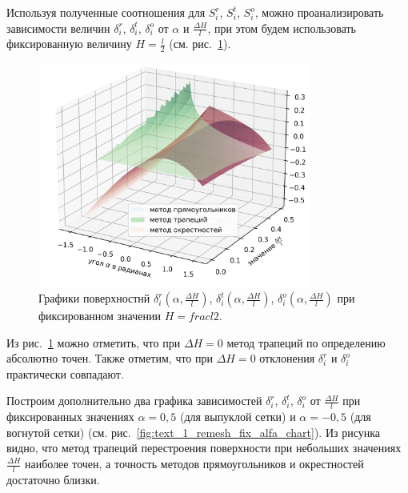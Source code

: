 Используя полученные соотношения для $S_i^r$, $S_i^t$, $S_i^o$, можно проанализировать зависимости величин $\delta_i^r$, $\delta_i^t$, $\delta_i^o$ от $\alpha$ и $\frac{\Delta H}{l}$, при этом будем использовать фиксированную величину $H = \frac{l}{2}$ (см. рис.~\ref{fig:text_1_remesh_3d_main_chart}).

\begin{figure}[ht]
\centering
\includegraphics[width=0.8\textwidth]{pics/text_1_remesh_2d/remesh_3d_chart.png}
\singlespacing
{}\caption{Графики поверхностнй $\delta_i^r(\alpha, \frac{\Delta H}{l})$, $\delta_i^t(\alpha, \frac{\Delta H}{l})$, $\delta_i^o(\alpha, \frac{\Delta H}{l})$ при фиксированном значении $H = frac{l}{2}$.}
\label{fig:text_1_remesh_3d_main_chart}
\end{figure}

Из рис.~\ref{fig:text_1_remesh_3d_main_chart} можно отметить, что при $\Delta H = 0$ метод трапеций по определению абсолютно точен.
Также отметим, что при $\Delta H = 0$ отклонения $\delta_i^r$ и $\delta_i^o$ практически совпадают.

Построим дополнительно два графика зависимостей $\delta_i^r$, $\delta_i^t$, $\delta_i^o$ от $\frac{\Delta H}{l}$ при фиксированных значениях $\alpha = 0,5$ (для выпуклой сетки) и $\alpha = -0,5$ (для вогнутой сетки) (см. рис.~\ref{fig:text_1_remesh_fix_alfa_chart}).
Из рисунка видно, что метод трапеций перестроения поверхности при небольших значениях $\frac{\Delta H}{l}$ наиболее точен, а точность методов прямоугольников и окрестностей достаточно близки.

